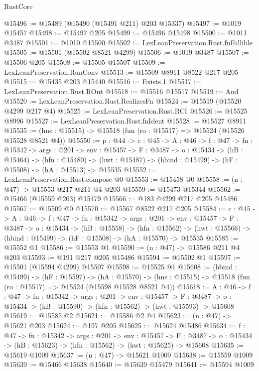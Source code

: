 \begin{lexlean}{RustCore}
\begin{coremodule}
@15496 := @15489 (@15490 (@15491 @211) @203 @15337)
@15497 := @1019 @15457
@15498 := @15497 @205
@15499 := @15496 @15498
@15500 := @1011 @3487
@15501 := @1010 @15500
@15502 := LexLeanPreservation.Rust.fnFallible
@15505 := @15501 (@15502 @8521 @4299)
@15506 := @1019 @3487
@15507 := @15506 @205
@15508 := @15505 @15507
@15509 := LexLeanPreservation.RunConv
@15513 := @15509 @8911 @8522 @217 @205
@15515 := @15435 @203 @15440
@15516 := Exists.{1}
@15517 := LexLeanPreservation.Rust.ROut
@15518 := @15516 @15517
@15519 := And
@15520 := LexLeanPreservation.Rust.RealizesFn
@15524 := @15519 (@15520 @4299 @217 @4)
@15525 := LexLeanPreservation.Rust.RCI
@15526 := @15525 @8996
@15527 := LexLeanPreservation.Rust.fnIdent
@15528 := @15527 @8911
@15535 := (hne : @15515) -> @15518 (fun (ro : @15517) => @15524 (@15526 @15528 @8521 @4))
@15550 := {p : @44} ->
  {c : @45} ->
  {A : @46} ->
  {f : @47} ->
  {fn : @15342} ->
  {args : @201} ->
  {env : @15457} ->
  {F : @3487} ->
  {o : @15434} ->
  (hB : @15464) ->
  (hfn : @15480) -> (hwt : @15487) -> (hbind : @15499) -> (hF : @15508) -> (hA : @15513) -> @15535
@15552 := LexLeanPreservation.Rust.compose @0
@15553 := @15458 @0
@15558 := (n : @47) -> @15553 @217 @211 @4 @203
@15559 := @15473 @15344
@15562 := @15466 (@15559 @203) @15479
@15566 := @183 @4299 @217 @205 @15486
@15567 := @15509 @0
@15570 := @15567 @8522 @217 @205
@15584 := {c : @45} ->
  {A : @46} ->
  {f : @47} ->
  {fn : @15342} ->
  {args : @201} ->
  {env : @15457} ->
  {F : @3487} ->
  {o : @15434} ->
  (hB : @15558) ->
  (hfn : @15562) -> (hwt : @15566) -> (hbind : @15499) -> (hF : @15508) -> (hA : @15570) -> @15535
@15585 := @15552 @1
@15586 := @15553 @1
@15590 := (n : @47) -> @15586 @211 @4 @203
@15593 := @191 @217 @205 @15486
@15594 := @15502 @1
@15597 := @15501 (@15594 @4299) @15507
@15598 := @15525 @1
@15608 := (hbind : @15499) ->
  (hF : @15597) ->
  (hA : @15570) -> (hne : @15515) -> @15518 (fun (ro : @15517) => @15524 (@15598 @15528 @8521 @4))
@15618 := {A : @46} ->
  {f : @47} ->
  {fn : @15342} ->
  {args : @201} ->
  {env : @15457} ->
  {F : @3487} -> {o : @15434} -> (hB : @15590) -> (hfn : @15562) -> (hwt : @15593) -> @15608
@15619 := @15585 @2
@15621 := @15586 @2 @4
@15623 := (n : @47) -> @15621 @203
@15624 := @197 @205
@15625 := @15624 @15486
@15634 := {f : @47} ->
  {fn : @15342} ->
  {args : @201} ->
  {env : @15457} ->
  {F : @3487} -> {o : @15434} -> (hB : @15623) -> (hfn : @15562) -> (hwt : @15625) -> @15608
@15635 := @15619 @1009
@15637 := (n : @47) -> @15621 @1009
@15638 := @15559 @1009
@15639 := @15466 @15638
@15640 := @15639 @15479
@15641 := @15594 @1009

\end{coremodule}
\end{lexlean}

